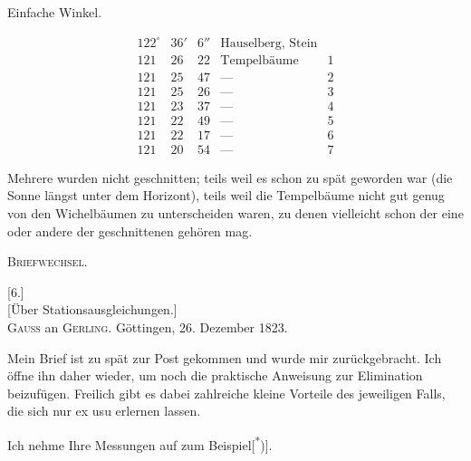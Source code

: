 \medskip
\noindent\begin{minipage}[t]{.43\textwidth}
\begin{center}Einfache Winkel.\end{center}
\[
\begin{array}{rrrlr}
122^\circ&36'&6''&\text{Hauselberg, Stein}&\\
121&26&22&\text{Tempelbäume}&1\\
121&25&47&\text{---}&2\\
121&25&26&\text{---}&3\\
121&23&37&\text{---}&4\\
121&22&49&\text{---}&5\\
121&22&17&\text{---}&6\\
121&20&54&\text{---}&7
\end{array}
\]
\end{minipage}\hfill
\begin{minipage}[t]{.54\textwidth}
\vspace{2.7\baselineskip}
Mehrere wurden nicht geschnitten; teils weil es schon zu spät geworden war (die Sonne längst unter dem Horizont), teils weil die Tempelbäume nicht gut genug von den Wichelbäumen zu unterscheiden waren, zu denen vielleicht schon der eine oder andere der geschnittenen gehören mag.
\end{minipage}

\clearpage
{}\hfill\textsc{Briefwechsel.}\hfill\mbox{}\par\bigskip
\begin{center}
[6.]\\[7pt]
[Über Stationsausgleichungen.]\\[14pt]
\textsc{Gauss} an \textsc{Gerling}. Göttingen, 26. Dezember 1823.
\end{center}
Mein Brief ist zu spät zur Post gekommen und wurde mir zurückgebracht. Ich öffne ihn daher wieder, um noch die praktische Anweisung zur Elimination beizufügen. Freilich gibt es dabei zahlreiche kleine Vorteile des jeweiligen Falls, die sich nur ex usu erlernen lassen.

Ich nehme Ihre Messungen auf  zum Beispiel[\textsuperscript{*})].

